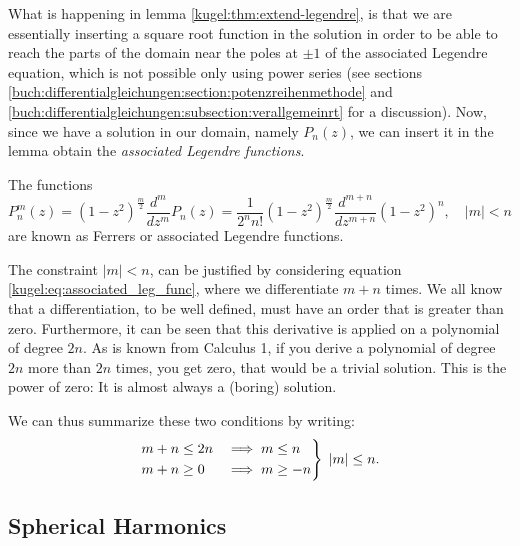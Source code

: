 What is happening in lemma \ref{kugel:thm:extend-legendre}, is that we are
essentially inserting a square root function in the solution in order to be able
to reach the parts of the domain near the poles at $\pm 1$ of the associated
Legendre equation, which is not possible only using power series (see sections
\ref{buch:differentialgleichungen:section:potenzreihenmethode} and
\ref{buch:differentialgleichungen:subsection:verallgemeinrt} for a discussion).
Now, since we have a solution in our domain, namely $P_n(z)$, we can insert it
in the lemma obtain the \emph{associated Legendre functions}.

\begin{definition}
  \label{kugel:def:ferrers-functions}
  The functions
  \begin{equation}
    P^m_n (z) = (1-z^2)^{\frac{m}{2}}\frac{d^{m}}{dz^{m}} P_n(z)
      = \frac{1}{2^n n!}(1-z^2)^{\frac{m}{2}}
        \frac{d^{m+n}}{dz^{m+n}}(1-z^2)^n, \quad |m|<n
  \end{equation}
  are known as Ferrers or associated Legendre functions.
\end{definition}
The constraint $|m|<n$, can be justified by considering equation
\eqref{kugel:eq:associated_leg_func}, where we differentiate $m+n$ times. We all
know that a differentiation, to be well defined, must have an order that is
greater than zero. Furthermore, it can be seen that this derivative is applied
on a polynomial of degree $2n$. As is known from Calculus 1, if you derive a
polynomial of degree $2n$ more than $2n$ times, you get zero, that would be a
trivial solution. This is the power of zero: It is almost always a (boring)
solution.

We can thus summarize these two conditions by writing:
\begin{equation*}
    \begin{rcases}
        m+n \leq 2n &\implies m \leq n \\
        m+n \geq 0  &\implies  m \geq -n
    \end{rcases} \; |m| \leq n.
\end{equation*}

\subsection{Spherical Harmonics}

